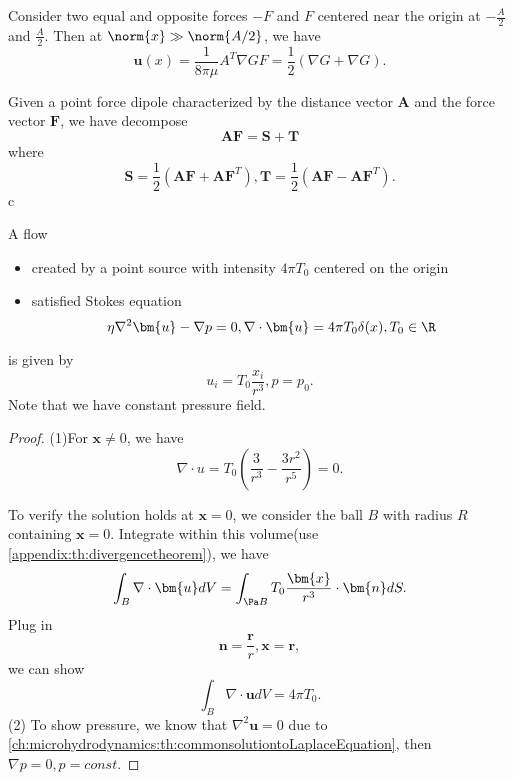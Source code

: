 \begin{refsection}
\begin{lemma}\cite[133]{barthes2012microhydrodynamics}
	Consider two equal and opposite forces $-F$ and $F$ centered near the origin at $-\frac{A}{2}$ and $\frac{A}{2}$. Then at $\norm{x}\gg \norm{A/2}$, we have
	$$\bm{u}(x) = \frac{1}{8\pi \mu} A^T \nabla G F = \frac{1}{2}(\nabla G + \nabla G).$$
\end{lemma}

\begin{remark}\cite[29]{kim2013microhydrodynamics}
Given a point force dipole characterized by the distance vector $\bm{A}$ and the force vector $\bm{F}$, we have decompose $$\bm{A}\bm{F} = \bm{S} + \bm{T}$$
where
$$\bm{S} = \frac{1}{2}(\bm{AF}+\bm{AF}^T), \bm{T} = \frac{1}{2}(\bm{AF}-\bm{AF}^T).$$c
\end{remark}



\begin{lemma}\cite[135]{barthes2012microhydrodynamics}
	A flow 
	\begin{itemize}
		\item created by a point source with intensity $4\pi T_0$ centered on the origin
		\item satisfied Stokes equation
		$$\eta \nabla^2 \bm{u} - \nabla p = 0, \nabla \cdot \bm{u} = 4\pi T_0\delta(x), T_0 \in \R$$
	\end{itemize} 
	is given by
	$$u_i = T_0\frac{x_i}{r^3}, p=p_0.$$ 
Note that we have constant pressure field.
\end{lemma}
\begin{proof}
(1)For $\bm{x}\neq 0$, we have
$$\nabla \cdot u = T_0( \frac{3}{r^3} - \frac{3r^2}{r^5}) = 0.$$

To verify the solution holds at $\bm{x} = 0$, we consider the ball $B$ with radius $R$ containing $\bm{x} = 0$. Integrate within this volume(use \autoref{appendix:th:divergencetheorem}), we have
$$\int_B \nabla \cdot \bm{u} dV = \int_{\Pa B} T_0 \frac{\bm{x}}{r^3}\cdot \bm{n} dS.$$
Plug in $$\bm{n} = \frac{\bm{r}}{r}, \bm{x} = \bm{r},$$ we can show
$$\int_B \nabla \cdot \bm{u} dV = 4\pi T_0.$$
(2) To show pressure, we know that $\nabla^2 \bm{u} = 0$ due to \autoref{ch:microhydrodynamics:th:commonsolutiontoLaplaceEquation}, then $\nabla p = 0, p = const$.

\end{proof}



\end{refsection}
